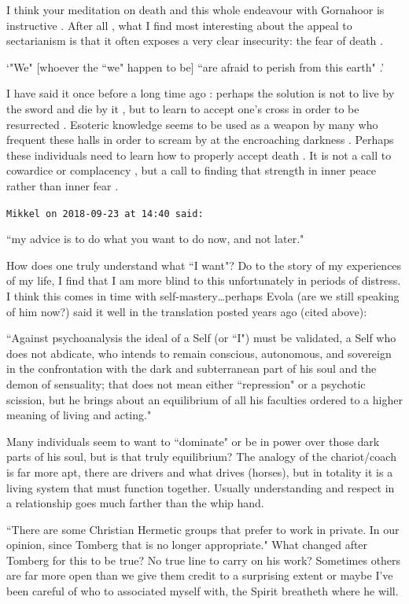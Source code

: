 \begin{footnotesize}
\begin{sffamily}
I think your meditation on death and this whole endeavour with Gornahoor is instructive . After all , what I find most interesting about the appeal to sectarianism is that it often exposes a very clear insecurity: the fear of death .

‘"We" [whoever the ``we" happen to be] ``are afraid to perish from this earth" .'

I have said it once before a long time ago : perhaps the solution is not to live by the sword and die by it , but to learn to accept one's cross in order to be resurrected . Esoteric knowledge seems to be used as a weapon by many who frequent these halls in order to scream by at the encroaching darkness . Perhaps these individuals need to learn how to properly accept death . It is not a call to cowardice or complacency , but a call to finding that strength in inner peace rather than inner fear .


\hfill

\texttt{Mikkel on 2018-09-23 at 14:40 said: }

``my advice is to do what you want to do now, and not later."

How does one truly understand what ``I want"? Do to the story of my experiences of my life, I find that I am more blind to this unfortunately in periods of distress. I think this comes in time with self-mastery…perhaps Evola (are we still speaking of him now?) said it well in the translation posted years ago (cited above):

``Against psychoanalysis the ideal of a Self (or ``I") must be validated, a Self who does not abdicate, who intends to remain conscious, autonomous, and sovereign in the confrontation with the dark and subterranean part of his soul and the demon of sensuality; that does not mean either ``repression" or a psychotic scission, but he brings about an equilibrium of all his faculties ordered to a higher meaning of living and acting."

Many individuals seem to want to ``dominate" or be in power over those dark parts of his soul, but is that truly equilibrium? The analogy of the chariot/coach is far more apt, there are drivers and what drives (horses), but in totality it is a living system that must function together. Usually understanding and respect in a relationship goes much farther than the whip hand.

``There are some Christian Hermetic groups that prefer to work in private. In our opinion, since Tomberg that is no longer appropriate." What changed after Tomberg for this to be true? No true line to carry on his work? Sometimes others are far more open than we give them credit to a surprising extent or maybe I've been careful of who to associated myself with, the Spirit breatheth where he will.


\end{sffamily}
\end{footnotesize}
